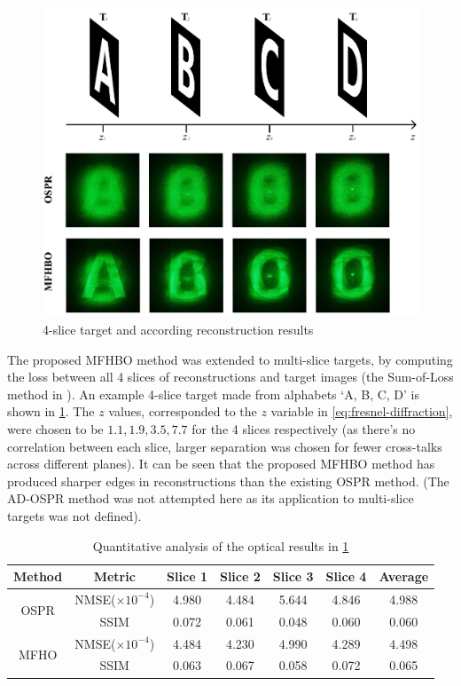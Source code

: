 	\begin{figure}[H]
		\centering
		\includegraphics[width=1.0\textwidth]{MFHO_OSPR_ABCD.pdf}
		\caption{4-slice target and according reconstruction results}
		\label{fig:MFHO_OSPR_ABCD}
	\end{figure}

	The proposed MFHBO method was extended to multi-slice targets, by computing the loss between all 4 slices of reconstructions and target images (the Sum-of-Loss method in \cite{Sha2023}). An example 4-slice target made from alphabets `A, B, C, D' is shown in \cref{fig:MFHO_OSPR_ABCD}. The $z$ values, corresponded to the $z$ variable in \cref{eq:fresnel-diffraction}, were chosen to be $1.1, 1.9, 3.5, 7.7$ for the 4 slices respectively (as there's no correlation between each slice, larger separation was chosen for fewer cross-talks across different planes). It can be seen that the proposed MFHBO method has produced sharper edges in reconstructions than the existing OSPR method. (The AD-OSPR method was not attempted here as its application to multi-slice targets was not defined).

	\begin{table}[H]
	\centering
	\begin{tabular}{|c|c|c|c|c|c|c|}
	\hline
	\textbf{Method} & \textbf{Metric} & \textbf{Slice 1} & \textbf{Slice 2} & \textbf{Slice 3} & \textbf{Slice 4} & \textbf{Average} \\ \hline
	\multirow{2}{*}{OSPR} & NMSE($\times 10^{-4}$) & 4.980 & 4.484 & 5.644 & 4.846 & 4.988 \\ \cline{2-7}
						  & SSIM                   & 0.072 & 0.061 & 0.048 & 0.060 & 0.060 \\ \hline
	\multirow{2}{*}{MFHO} & NMSE($\times 10^{-4}$) & 4.484 & 4.230 & 4.990 & 4.289 & 4.498 \\ \cline{2-7}
						  & SSIM                   & 0.063 & 0.067 & 0.058 & 0.072 & 0.065 \\ \hline
	\end{tabular}
	\caption{Quantitative analysis of the optical results in \cref{fig:MFHO_OSPR_ABCD}}
	\label{tab:quant_MFHO_OSPR_ABCD}
	\end{table}

